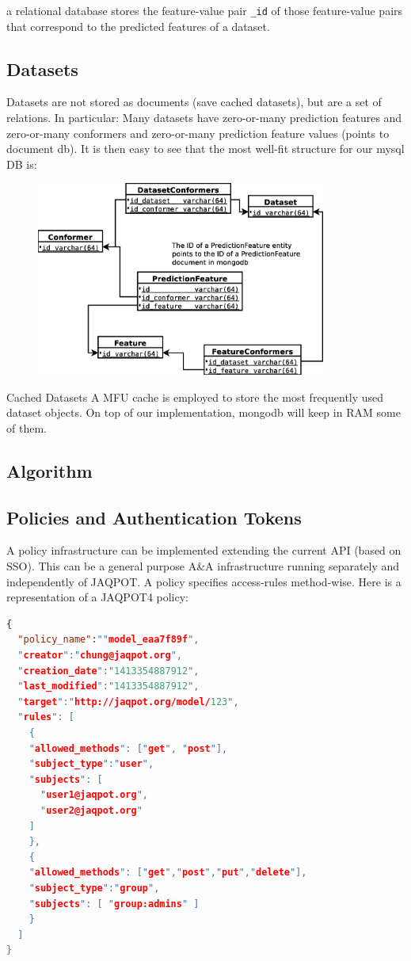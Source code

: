 a relational database stores the feature-value pair \texttt{\_id} of those 
feature-value pairs that correspond to the predicted features of a dataset. 

\subsection{Datasets}
Datasets are not stored as documents (save cached datasets), but are a set of relations. In particular:
Many datasets have zero-or-many prediction features and zero-or-many conformers and zero-or-many 
prediction feature values (points to document db).
It is then easy to see that the most well-fit structure for our mysql DB is:

\begin{figure}[h]
 \centering
 \includegraphics[keepaspectratio=true,width=0.85\textwidth]{figures/JAQPOT_Quattro_RDB}
\end{figure}


Cached Datasets
A MFU cache is employed to store the most frequently used dataset objects. On top of our implementation, mongodb will keep in RAM some of them.

\subsection{Algorithm}


\subsection{Policies and Authentication Tokens}
A policy infrastructure can be implemented extending the current API 
(based on SSO). This can be a general purpose A\&A infrastructure running separately 
and independently of JAQPOT. A policy specifies access-rules method-wise. 
Here is a representation of a JAQPOT4 policy:
\begin{lstlisting}[language=json]
{
  "policy_name":""model_eaa7f89f",
  "creator":"chung@jaqpot.org",
  "creation_date":"1413354887912",
  "last_modified":"1413354887912",
  "target":"http://jaqpot.org/model/123",
  "rules": [
    {
    "allowed_methods": ["get", "post"],
    "subject_type":"user",
    "subjects": [
      "user1@jaqpot.org",
      "user2@jaqpot.org"
    ]
    },
    {
    "allowed_methods": ["get","post","put","delete"],
    "subject_type":"group",
    "subjects": [ "group:admins" ]
    }
  ]
}
\end{lstlisting}

